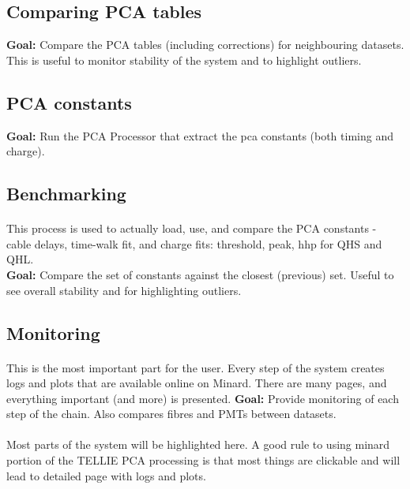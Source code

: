 \documentclass[12pt]{article}
\begin{document}
\clearpage

\subsection{Comparing PCA tables}
\textbf{Goal:} Compare the PCA tables (including corrections) for neighbouring datasets. This is useful to monitor stability of the system and to highlight outliers.

\subsection{PCA constants}
\textbf{Goal:} Run the PCA Processor that extract the pca constants (both timing and charge).

\subsection{Benchmarking}
\paragraph{}
This process is used to actually load, use, and compare the PCA constants - cable delays, time-walk fit, and charge fits: threshold, peak, hhp for QHS and QHL.\\
\textbf{Goal:} Compare the set of constants against the closest (previous) set. Useful to see overall stability and for highlighting outliers.

\subsection{Monitoring}
\paragraph{}
This is the most important part for the user. Every step of the system creates logs and plots that are available online on Minard. There are many pages, and everything important (and more) is presented. 
\textbf{Goal:} Provide monitoring of each step of the chain. Also compares fibres and PMTs between datasets.

\paragraph{}
Most parts of the system will be highlighted here. A good rule to using minard portion of the TELLIE PCA processing is that most things are clickable and will lead to detailed page with logs and plots.
\end{document}
